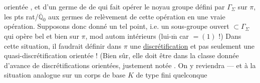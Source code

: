 orientée ,
et d'un germe de 
de
\unsure{)|,}
qui fait opérer  le noyau  groupe
défini par $\Gamma_{\Sigma}$ sur $\pi$, les pts rat/$\overline{\mathbb Q}_0$
 aux
 germes de relèvement de
cette opération\unsure{,}  en une vraie opération.
Supposons donc donné un tel point, i.e.
  un sous-groupe ouvert
$\subset\Gamma_{\Sigma}$
qui opère bel et bien sur $\pi$,
 mod autom intérieurs
(lui-$\overline{\mathrm m}$ 
car \unsure{$\pi^{\Gamma}$|$\overline\pi^{\Gamma}$}$=(1)$ !)
Dans cette situation, il faudrait définir dans $\pi$
une \uline{discrétification}
et pas seulement une quasi-discrétification orientée !
 (Bien sûr, elle doit être dans la classe   donnée d'avance
de  discrétifications orientées, 
justement notée .
On y reviendra --- et à la situation analogue sur un corps de
base $K$ de type fini quelconque


